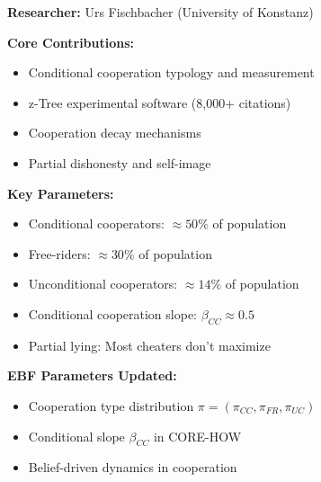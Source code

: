 \begin{abstract}
This appendix integrates Urs Fischbacher's research on conditional cooperation, experimental methodology, and social norms into the Evidence-Based Framework. Fischbacher's work establishes that cooperation types are heterogeneous and measurable: approximately 50\% are conditional cooperators, 30\% free-riders, and 14\% unconditional cooperators. His creation of z-Tree revolutionized experimental economics methodology. We formalize six core axioms (FI-1 to FI-6) connecting cooperation dynamics to EBF. Key parameters include conditional cooperation slope ($\beta_{CC} \approx 0.5$), cooperation decay rate, and partial lying prevalence. Co-author with Ernst Fehr on foundational social preferences papers.
\end{abstract}

\begin{tcolorbox}[colback=gray!5!white,colframe=gray!75!black,title=Quick Reference]
\textbf{Researcher:} Urs Fischbacher (University of Konstanz)

\textbf{Core Contributions:}
\begin{itemize}
    \item Conditional cooperation typology and measurement
    \item z-Tree experimental software (8,000+ citations)
    \item Cooperation decay mechanisms
    \item Partial dishonesty and self-image
\end{itemize}

\textbf{Key Parameters:}
\begin{itemize}
    \item Conditional cooperators: $\approx 50\%$ of population
    \item Free-riders: $\approx 30\%$ of population
    \item Unconditional cooperators: $\approx 14\%$ of population
    \item Conditional cooperation slope: $\beta_{CC} \approx 0.5$
    \item Partial lying: Most cheaters don't maximize
\end{itemize}

\textbf{EBF Parameters Updated:}
\begin{itemize}
    \item Cooperation type distribution $\pi = (\pi_{CC}, \pi_{FR}, \pi_{UC})$
    \item Conditional slope $\beta_{CC}$ in CORE-HOW
    \item Belief-driven dynamics in cooperation
\end{itemize}
\end{tcolorbox}

